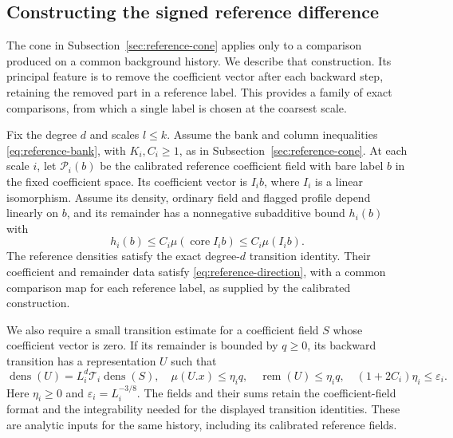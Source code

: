 \subsection{Constructing the signed reference difference}
\label{sec:reference-difference}
The cone in Subsection~\ref{sec:reference-cone} applies only to a
comparison produced on a common background history. We describe
that construction. Its principal feature is to remove the
coefficient vector after each backward step, retaining the removed
part in a reference label. This provides a family of exact
comparisons, from which a single label is chosen at the coarsest
scale.

Fix the degree $d$ and scales $l\le k$. Assume the bank and
column inequalities \eqref{eq:reference-bank}, with $K_i,C_i\ge1$,
as in Subsection~\ref{sec:reference-cone}. At each scale $i$, let
$\mathcal P_i(b)$ be the calibrated reference coefficient field
with bare label $b$ in the fixed coefficient space. Its coefficient
vector is $I_i b$, where $I_i$ is a linear isomorphism. Assume its
density, ordinary field and flagged profile depend linearly on
$b$, and its remainder has a nonnegative subadditive bound $h_i(b)$
with
\begin{equation}\label{eq:reference-primary-charge}
           h_i(b)\le C_i\mu(\operatorname{core}I_i b)
                         \le C_i\mu(I_i b).
\end{equation}
The reference densities satisfy the exact degree-$d$ transition
identity. Their coefficient and remainder data satisfy
\eqref{eq:reference-direction}, with a common comparison map for
each reference label, as supplied by the calibrated construction.

We also require a small transition estimate for a coefficient
field $S$ whose coefficient vector is zero. If its remainder is
bounded by $q\ge0$, its backward transition has a representation
$U$ such that
\begin{equation}\label{eq:reference-zero-transition}
 \operatorname{dens}(U)=L_i^d\mathcal T_i\operatorname{dens}(S),
 \quad \mu(U.x)\le\eta_i q,\quad
 \operatorname{rem}(U)\le\eta_i q,
 \quad (1+2C_i)\eta_i\le\varepsilon_i.
\end{equation}
Here $\eta_i\ge0$ and $\varepsilon_i=L_i^{-3/8}$.
The fields and their sums retain the coefficient-field format and
the integrability needed for the displayed transition identities.
These are analytic inputs for the same history, including its
calibrated reference fields.

